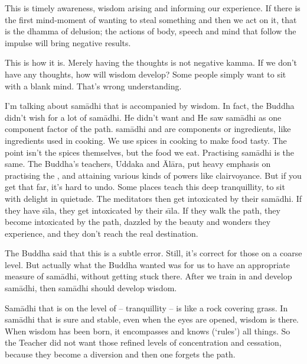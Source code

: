 This is timely awareness, wisdom arising and informing our experience. If there is the first mind-moment of wanting to steal something and then we act on it, that is the dhamma of delusion; the actions of body, speech and mind that follow the impulse will bring negative results.

This is how it is. Merely having the thoughts is not negative kamma. If we don't have any thoughts, how will wisdom develop? Some people simply want to sit with a blank mind. That's wrong understanding.

I'm talking about sam\=adhi that is accompanied by wisdom. In fact, the Buddha didn't wish for a lot of sam\=adhi. He didn't want  and  He saw sam\=adhi as one component factor of the path.  sam\=adhi and  are components or ingredients, like ingredients used in cooking. We use spices in cooking to make food tasty. The point isn't the spices themselves, but the food we eat. Practising sam\=adhi is the same. The Buddha's teachers, Uddaka and \=Al\=ara, put heavy emphasis on practising the , and attaining various kinds of powers like clairvoyance. But if you get that far, it's hard to undo. Some places teach this deep tranquillity, to sit with delight in quietude. The meditators then get intoxicated by their sam\=adhi. If they have s\={\i}la, they get intoxicated by their s\={\i}la. If they walk the path, they become intoxicated by the path, dazzled by the beauty and wonders they experience, and they don't reach the real destination.

The Buddha said that this is a subtle error. Still, it's correct for those on a coarse level. But actually what the Buddha wanted was for us to have an appropriate measure of sam\=adhi, without getting stuck there. After we train in and develop sam\=adhi, then sam\=adhi should develop wisdom.

Sam\=adhi that is on the level of  -- tranquillity -- is like a rock covering grass. In sam\=adhi that is sure and stable, even when the eyes are opened, wisdom is there. When wisdom has been born, it encompasses and knows (`rules') all things. So the Teacher did not want those refined levels of concentration and cessation, because they become a diversion and then one forgets the path.

